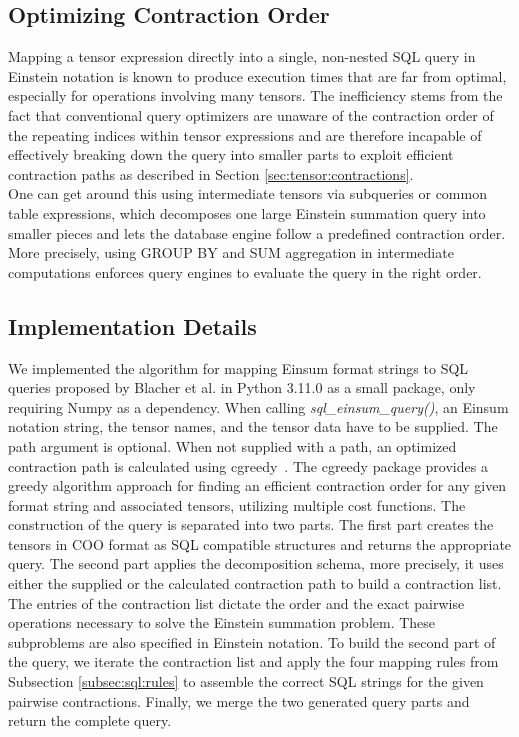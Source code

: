\subsection{Optimizing Contraction Order}
Mapping a tensor expression directly into a single, non-nested SQL query in Einstein
notation is known to produce execution times that are far from optimal, especially for operations
involving many tensors. The inefficiency stems from the fact that conventional query optimizers
are unaware of the contraction order of the repeating indices within tensor expressions and are
therefore incapable of effectively breaking down the query into smaller parts to exploit efficient
contraction paths as described in Section \ref{sec:tensor:contractions}.\\
One can get around this using intermediate tensors via subqueries or common table expressions,
which decomposes one large Einstein summation query into smaller pieces and lets the database
engine follow a predefined contraction order. More precisely, using GROUP BY and SUM
aggregation in intermediate computations enforces query engines to evaluate the query in the
right order.

\subsection{Implementation Details}
We implemented the algorithm for mapping Einsum format strings to SQL queries proposed by Blacher
et al. in Python 3.11.0 as a small package, only requiring Numpy as a dependency. When
calling \textit{sql\_einsum\_query()}, an Einsum notation string, the tensor names, and the tensor
data have to be supplied. The path argument is optional. When not supplied with a path, an
optimized contraction path is calculated using cgreedy~\cite{cgreedy}. The cgreedy package
provides a greedy algorithm approach for finding an efficient contraction order for any given
format string and associated tensors, utilizing multiple cost functions. The construction of the
query is separated into two parts. The first part creates the tensors in COO format as SQL
compatible structures and returns the appropriate query. The second part applies the decomposition
schema, more precisely, it uses either the supplied or the calculated contraction path to build a
contraction list. The entries of the contraction list dictate the order and the exact pairwise
operations necessary to solve the Einstein summation problem. These subproblems are also specified
in Einstein notation. To build the second part of the query, we iterate the contraction list and
apply the four mapping rules from Subsection \ref{subsec:sql:rules} to assemble the correct SQL
strings for the given pairwise contractions. Finally, we merge the two generated query parts and
return the complete query.

